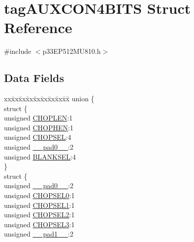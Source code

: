 \hypertarget{structtag_a_u_x_c_o_n4_b_i_t_s}{}\section{tag\+A\+U\+X\+C\+O\+N4\+B\+I\+TS Struct Reference}
\label{structtag_a_u_x_c_o_n4_b_i_t_s}


{\ttfamily \#include $<$p33\+E\+P512\+M\+U810.\+h$>$}

\subsection*{Data Fields}
\begin{DoxyCompactItemize}
\item 
\begin{tabbing}
xx\=xx\=xx\=xx\=xx\=xx\=xx\=xx\=xx\=\kill
union \{\\
\>struct \{\\
\>\>unsigned \hyperlink{structtag_a_u_x_c_o_n4_b_i_t_s_a3ef61325b83d3685e2364392dd43dd06}{CHOPLEN}:1\\
\>\>unsigned \hyperlink{structtag_a_u_x_c_o_n4_b_i_t_s_a38243e11a4372e45b55166fcec4322fa}{CHOPHEN}:1\\
\>\>unsigned \hyperlink{structtag_a_u_x_c_o_n4_b_i_t_s_aafc704d0a50b4ba0c019d33514cb7782}{CHOPSEL}:4\\
\>\>unsigned \hyperlink{structtag_a_u_x_c_o_n4_b_i_t_s_adf71f3d8410c1f1dbbc96680a92c49af}{\_\_pad0\_\_}:2\\
\>\>unsigned \hyperlink{structtag_a_u_x_c_o_n4_b_i_t_s_a16dd126500ffc8232d3b8e619c4406a2}{BLANKSEL}:4\\
\>\} \\
\>struct \{\\
\>\>unsigned \hyperlink{structtag_a_u_x_c_o_n4_b_i_t_s_adf71f3d8410c1f1dbbc96680a92c49af}{\_\_pad0\_\_}:2\\
\>\>unsigned \hyperlink{structtag_a_u_x_c_o_n4_b_i_t_s_acc4daaf21ff4590b40d3f25dad388167}{CHOPSEL0}:1\\
\>\>unsigned \hyperlink{structtag_a_u_x_c_o_n4_b_i_t_s_a5be3cb702a6c27dd28ee2f7bb142c88c}{CHOPSEL1}:1\\
\>\>unsigned \hyperlink{structtag_a_u_x_c_o_n4_b_i_t_s_ae9a19a5d1e40ae671a2b05fa09e77c10}{CHOPSEL2}:1\\
\>\>unsigned \hyperlink{structtag_a_u_x_c_o_n4_b_i_t_s_a6bcb1f80b40842c9ebd3c9d76d4c196f}{CHOPSEL3}:1\\
\>\>unsigned \hyperlink{structtag_a_u_x_c_o_n4_b_i_t_s_acaf2d0924a107ec6e8d2e31febaf66f9}{\_\_pad1\_\_}:2\\

\end{tabbing}
\end{DoxyCompactItemize}
